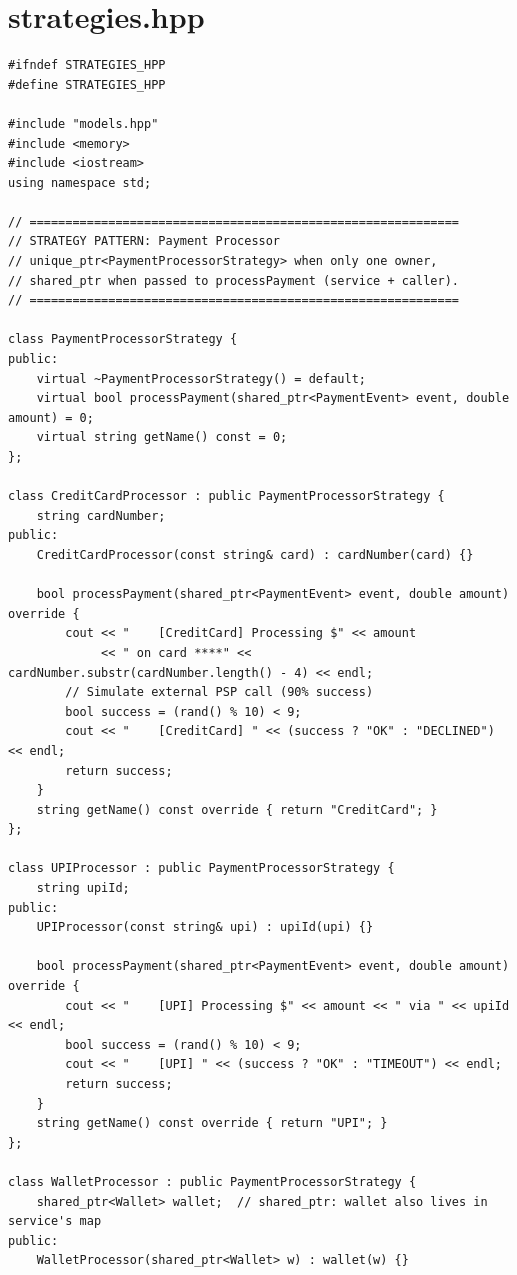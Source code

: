 \documentclass[11pt,a4paper]{article}
\begin{document}
\section{strategies.hpp}
\begin{lstlisting}[title={\texttt{strategies.hpp}}]
#ifndef STRATEGIES_HPP
#define STRATEGIES_HPP

#include "models.hpp"
#include <memory>
#include <iostream>
using namespace std;

// ============================================================
// STRATEGY PATTERN: Payment Processor
// unique_ptr<PaymentProcessorStrategy> when only one owner,
// shared_ptr when passed to processPayment (service + caller).
// ============================================================

class PaymentProcessorStrategy {
public:
    virtual ~PaymentProcessorStrategy() = default;
    virtual bool processPayment(shared_ptr<PaymentEvent> event, double amount) = 0;
    virtual string getName() const = 0;
};

class CreditCardProcessor : public PaymentProcessorStrategy {
    string cardNumber;
public:
    CreditCardProcessor(const string& card) : cardNumber(card) {}

    bool processPayment(shared_ptr<PaymentEvent> event, double amount) override {
        cout << "    [CreditCard] Processing $" << amount
             << " on card ****" << cardNumber.substr(cardNumber.length() - 4) << endl;
        // Simulate external PSP call (90% success)
        bool success = (rand() % 10) < 9;
        cout << "    [CreditCard] " << (success ? "OK" : "DECLINED") << endl;
        return success;
    }
    string getName() const override { return "CreditCard"; }
};

class UPIProcessor : public PaymentProcessorStrategy {
    string upiId;
public:
    UPIProcessor(const string& upi) : upiId(upi) {}

    bool processPayment(shared_ptr<PaymentEvent> event, double amount) override {
        cout << "    [UPI] Processing $" << amount << " via " << upiId << endl;
        bool success = (rand() % 10) < 9;
        cout << "    [UPI] " << (success ? "OK" : "TIMEOUT") << endl;
        return success;
    }
    string getName() const override { return "UPI"; }
};

class WalletProcessor : public PaymentProcessorStrategy {
    shared_ptr<Wallet> wallet;  // shared_ptr: wallet also lives in service's map
public:
    WalletProcessor(shared_ptr<Wallet> w) : wallet(w) {}


\end{lstlisting}
\end{document}
